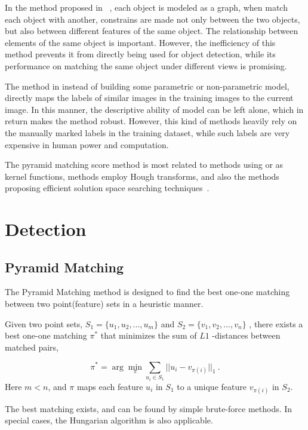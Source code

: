 In the method proposed in ~\cite{ac222}, each object is modeled as a graph, when match each object with another, constrains are made not only between the two objects, but also between different features of the same object. The relationship between elements of the same object is important. However, the inefficiency of this method prevents it from directly being used for object detection, while its performance on matching the same object under different views is promising.

The method in \cite{lbt1} instead of building some parametric or non-parametric model, directly maps the labels of similar images in the training images to the current image. In this manner, the descriptive ability of model can be left alone, which in return makes the method robust. However, this kind of methods heavily rely on the manually marked labels in the training dataset, while such labels are very expensive in human power and computation. 

The pyramid matching score method is most related to methods using \cite{pmk} or \cite{kmts} as kernel functions, methods employ Hough transforms, and also the methods proposing efficient solution space searching techniques~\cite{bab}.



\section{Detection}
\label{dt5}

\subsection{Pyramid Matching}

The Pyramid Matching method is designed to find the best one-one matching between two point(feature) sets in a heuristic manner.

Given two point sets, ${S_1} = \{ {u_1},{u_2},...,{u_m}\} $
 and ${S_2} = \{ {v_1},{v_2},...,{v_n}\} $
, there exists a best one-one matching ${\pi}^*$ that minimizes the sum of $L1$
-distances between matched pairs,

\[
{\pi ^*} = \arg \mathop {\min }\limits_\pi  \sum\limits_{{u_i} \in {S_1}} {||{u_i} - {v_{\pi (i)}}|{|_1}} \ .
\]
Here $m<n$, and $\pi$ maps each feature $u_i$ in $S_1$ to a unique feature ${{v_{\pi (i)}}}
$ in $S_2$.

The best matching exists, and can be found by simple brute-force methods. In special cases, the Hungarian algorithm is also applicable.

